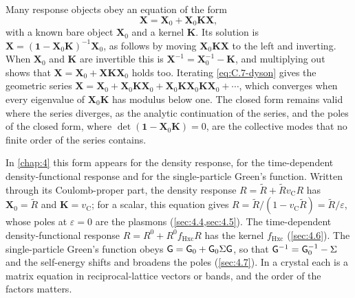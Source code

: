 Many response objects obey an equation of the form
\begin{equation}
  \mathbf{X} = \mathbf{X}_0 + \mathbf{X}_0\mathbf{K}\mathbf{X} ,
  \label{eq:C.7-dyson}
\end{equation}
with a known bare object $\mathbf{X}_0$ and a kernel $\mathbf{K}$. Its solution is $\mathbf{X} = (\mathbf{1} - \mathbf{X}_0\mathbf{K})^{-1}\mathbf{X}_0$, as follows by moving $\mathbf{X}_0\mathbf{K}\mathbf{X}$ to the left and inverting. When $\mathbf{X}_0$ and $\mathbf{K}$ are invertible this is $\mathbf{X}^{-1} = \mathbf{X}_0^{-1} - \mathbf{K}$, and multiplying out shows that $\mathbf{X} = \mathbf{X}_0 + \mathbf{X}\mathbf{K}\mathbf{X}_0$ holds too. Iterating \cref{eq:C.7-dyson} gives the geometric series $\mathbf{X} = \mathbf{X}_0 + \mathbf{X}_0\mathbf{K}\mathbf{X}_0 + \mathbf{X}_0\mathbf{K}\mathbf{X}_0\mathbf{K}\mathbf{X}_0 + \cdots$, which converges when every eigenvalue of $\mathbf{X}_0\mathbf{K}$ has modulus below one. The closed form remains valid where the series diverges, as the analytic continuation of the series, and the poles of the closed form, where $\det(\mathbf{1} - \mathbf{X}_0\mathbf{K}) = 0$, are the collective modes that no finite order of the series contains.

In \cref{chap:4} this form appears for the density response, for the time-dependent density-functional response and for the single-particle Green's function. Written through its Coulomb-proper part, the density response $R = \tilde R + \tilde Rv_{\mathrm{C}}R$ has $\mathbf{X}_0 = \tilde R$ and $\mathbf{K} = v_{\mathrm{C}}$; for a scalar, this equation gives $R = \tilde R/(1 - v_{\mathrm{C}}\tilde R) = \tilde R/\varepsilon$, whose poles at $\varepsilon = 0$ are the plasmons (\cref{sec:4.4,sec:4.5}). The time-dependent density-functional response $R = R^0 + R^0f_{\mathrm{Hxc}}R$ has the kernel $f_{\mathrm{Hxc}}$ (\cref{sec:4.6}). The single-particle Green's function obeys $\mathsf{G} = \mathsf{G}_0 + \mathsf{G}_0\Sigma\mathsf{G}$, so that $\mathsf{G}^{-1} = \mathsf{G}_0^{-1} - \Sigma$ and the self-energy shifts and broadens the poles (\cref{sec:4.7}). In a crystal each is a matrix equation in reciprocal-lattice vectors or bands, and the order of the factors matters.

